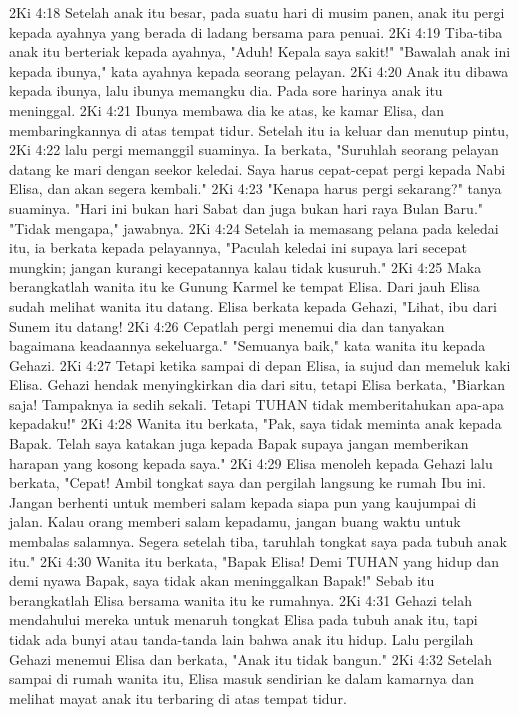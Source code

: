 2Ki 4:18  Setelah anak itu besar, pada suatu hari di musim panen, anak itu pergi kepada ayahnya yang berada di ladang bersama para penuai.
2Ki 4:19  Tiba-tiba anak itu berteriak kepada ayahnya, "Aduh! Kepala saya sakit!" "Bawalah anak ini kepada ibunya," kata ayahnya kepada seorang pelayan.
2Ki 4:20  Anak itu dibawa kepada ibunya, lalu ibunya memangku dia. Pada sore harinya anak itu meninggal.
2Ki 4:21  Ibunya membawa dia ke atas, ke kamar Elisa, dan membaringkannya di atas tempat tidur. Setelah itu ia keluar dan menutup pintu,
2Ki 4:22  lalu pergi memanggil suaminya. Ia berkata, "Suruhlah seorang pelayan datang ke mari dengan seekor keledai. Saya harus cepat-cepat pergi kepada Nabi Elisa, dan akan segera kembali."
2Ki 4:23  "Kenapa harus pergi sekarang?" tanya suaminya. "Hari ini bukan hari Sabat dan juga bukan hari raya Bulan Baru." "Tidak mengapa," jawabnya.
2Ki 4:24  Setelah ia memasang pelana pada keledai itu, ia berkata kepada pelayannya, "Paculah keledai ini supaya lari secepat mungkin; jangan kurangi kecepatannya kalau tidak kusuruh."
2Ki 4:25  Maka berangkatlah wanita itu ke Gunung Karmel ke tempat Elisa. Dari jauh Elisa sudah melihat wanita itu datang. Elisa berkata kepada Gehazi, "Lihat, ibu dari Sunem itu datang!
2Ki 4:26  Cepatlah pergi menemui dia dan tanyakan bagaimana keadaannya sekeluarga." "Semuanya baik," kata wanita itu kepada Gehazi.
2Ki 4:27  Tetapi ketika sampai di depan Elisa, ia sujud dan memeluk kaki Elisa. Gehazi hendak menyingkirkan dia dari situ, tetapi Elisa berkata, "Biarkan saja! Tampaknya ia sedih sekali. Tetapi TUHAN tidak memberitahukan apa-apa kepadaku!"
2Ki 4:28  Wanita itu berkata, "Pak, saya tidak meminta anak kepada Bapak. Telah saya katakan juga kepada Bapak supaya jangan memberikan harapan yang kosong kepada saya."
2Ki 4:29  Elisa menoleh kepada Gehazi lalu berkata, "Cepat! Ambil tongkat saya dan pergilah langsung ke rumah Ibu ini. Jangan berhenti untuk memberi salam kepada siapa pun yang kaujumpai di jalan. Kalau orang memberi salam kepadamu, jangan buang waktu untuk membalas salamnya. Segera setelah tiba, taruhlah tongkat saya pada tubuh anak itu."
2Ki 4:30  Wanita itu berkata, "Bapak Elisa! Demi TUHAN yang hidup dan demi nyawa Bapak, saya tidak akan meninggalkan Bapak!" Sebab itu berangkatlah Elisa bersama wanita itu ke rumahnya.
2Ki 4:31  Gehazi telah mendahului mereka untuk menaruh tongkat Elisa pada tubuh anak itu, tapi tidak ada bunyi atau tanda-tanda lain bahwa anak itu hidup. Lalu pergilah Gehazi menemui Elisa dan berkata, "Anak itu tidak bangun."
2Ki 4:32  Setelah sampai di rumah wanita itu, Elisa masuk sendirian ke dalam kamarnya dan melihat mayat anak itu terbaring di atas tempat tidur.
